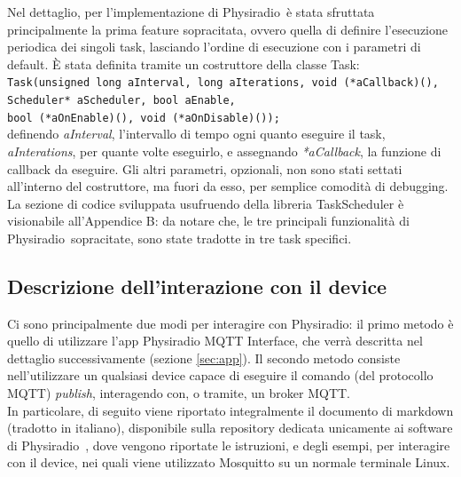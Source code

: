 \documentclass[12pt,a4paper]{report}
\newcommand{\physiradio}{Physiradio} %
\begin{document}
Nel dettaglio, per l'implementazione di \physiradio\ è stata sfruttata principalmente la prima feature sopracitata, ovvero quella di definire l'esecuzione periodica dei singoli task, lasciando l'ordine di esecuzione con i parametri di default. È stata definita tramite un costruttore della classe Task:\\
\texttt{Task(unsigned long aInterval, long aIterations, void (*aCallback)(), \\
		Scheduler* aScheduler, bool aEnable,\\
		bool (*aOnEnable)(), void (*aOnDisable)());}\\
definendo \textit{aInterval}, l'intervallo di tempo ogni quanto eseguire il task, \textit{aInterations}, per quante volte eseguirlo, e assegnando \textit{*aCallback}, la funzione di callback da eseguire. Gli altri parametri, opzionali, non sono stati settati all'interno del costruttore, ma fuori da esso, per semplice comodità di debugging.\\
La sezione di codice sviluppata usufruendo della libreria TaskScheduler è visionabile all'Appendice B: da notare che, le tre principali funzionalità di \physiradio\ sopracitate, sono state tradotte in tre task specifici.\\  


\subsection{Descrizione dell'interazione con il device} \label{sec:descriptionInteraction}

Ci sono principalmente due modi per interagire con \physiradio: il primo metodo è quello di utilizzare l'app Physiradio MQTT Interface, che verrà descritta nel dettaglio successivamente (sezione \ref{sec:app}). Il secondo metodo consiste nell'utilizzare un qualsiasi device capace di eseguire il comando (del protocollo MQTT) \textit{publish}, interagendo con, o tramite, un broker MQTT. \\
In particolare, di seguito viene riportato integralmente  il documento di markdown (tradotto in italiano), disponibile sulla repository dedicata unicamente ai software di \physiradio\ \cite{repositorySwOnly}, dove vengono riportate le istruzioni, e degli esempi, per interagire con il device, nei quali viene utilizzato Mosquitto \cite{mosquitto} su un normale terminale Linux. \\ %
\end{document}
